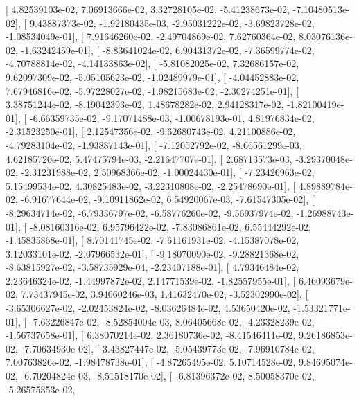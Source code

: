 \documentclass{article}
\begin{document}
       [  4.82539103e-02,   7.06913666e-02,   3.32728105e-02,
         -5.41238673e-02,  -7.10480513e-02],
       [  9.43887373e-02,  -1.92180435e-03,  -2.95031222e-02,
         -3.69823728e-02,  -1.08534049e-01],
       [  7.91646260e-02,  -2.49704869e-02,   7.62760364e-02,
          8.03076136e-02,  -1.63242459e-01],
       [ -8.83641024e-02,   6.90431372e-02,  -7.36599774e-02,
         -4.70788814e-02,  -4.14133863e-02],
       [ -5.81082025e-02,   7.32686157e-02,   9.62097309e-02,
         -5.05105623e-02,  -1.02489979e-01],
       [ -4.04452883e-02,   7.67946816e-02,  -5.97228027e-02,
         -1.98215683e-02,  -2.30274251e-01],
       [  3.38751244e-02,  -8.19042393e-02,   1.48678282e-02,
          2.94128317e-02,  -1.82100419e-01],
       [ -6.66359735e-02,  -9.17071488e-03,  -1.00678193e-01,
          4.81976834e-02,  -2.31523250e-01],
       [  2.12547356e-02,  -9.62680743e-02,   4.21100886e-02,
         -4.79283104e-02,  -1.93887143e-01],
       [ -7.12052792e-02,  -8.66561299e-03,   4.62185720e-02,
          5.47475794e-03,  -2.21647707e-01],
       [  2.68713573e-03,  -3.29370048e-02,  -2.31231988e-02,
          2.50968366e-02,  -1.00024430e-01],
       [ -7.23426963e-02,   5.15499534e-02,   4.30825483e-02,
         -3.22310808e-02,  -2.25478690e-01],
       [  4.89889784e-02,  -6.91677644e-02,  -9.10911862e-02,
          6.54920067e-03,  -7.61547305e-02],
       [ -8.29634714e-02,  -6.79336797e-02,  -6.58776260e-02,
         -9.56937974e-02,  -1.26988743e-01],
       [ -8.08160316e-02,   6.95796422e-02,  -7.83086861e-02,
          6.55444292e-02,  -1.45835868e-01],
       [  8.70141745e-02,  -7.61161931e-02,  -4.15387078e-02,
          3.12033101e-02,  -2.07966532e-01],
       [ -9.18070090e-02,  -9.28821368e-02,  -8.63815927e-02,
         -3.58735929e-04,  -2.23407188e-01],
       [  4.79346484e-02,   2.23646324e-02,  -1.44997872e-02,
          2.14771539e-02,  -1.82557955e-01],
       [  6.46093679e-02,   7.73437945e-02,   3.94060246e-03,
          1.41632470e-02,  -3.52302990e-02],
       [ -3.65306627e-02,  -2.02453824e-02,  -8.03626484e-02,
          4.53650420e-02,  -1.53321771e-01],
       [ -7.63226847e-02,  -8.52854004e-03,   8.06405668e-02,
         -4.23328239e-02,  -1.56737658e-01],
       [  6.38070214e-02,   2.36180736e-02,  -8.41546411e-02,
          9.26186853e-02,  -7.70634930e-02],
       [  3.43827447e-02,  -5.05439773e-02,  -7.96910784e-02,
          7.00763826e-02,  -1.98478738e-01],
       [ -4.87265495e-02,   5.10714528e-02,   9.84695074e-02,
         -6.70204824e-03,  -8.51518170e-02],
       [ -6.81396372e-02,   8.50058370e-02,  -5.26575353e-02,
\end{document}
